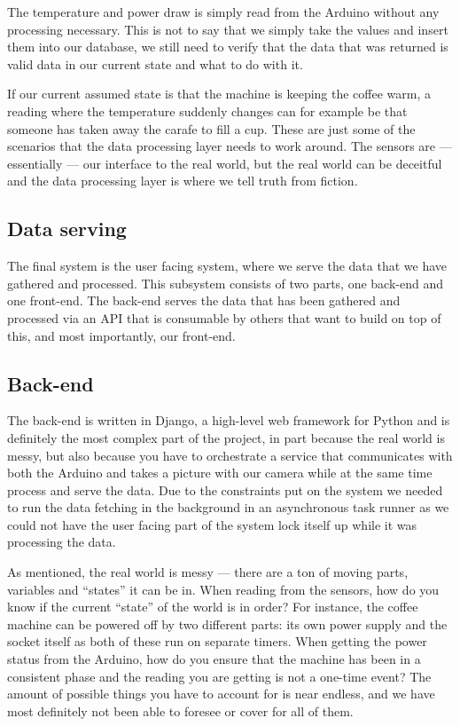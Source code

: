 \documentclass[12pt,a4paper,oneside,article]{memoir}
\numberwithin{equation}{chapter}
\begin{document}
The temperature and power draw is simply read from the Arduino without any
processing necessary. This is not to say that we simply take the values and
insert them into our database, we still need to verify that the data that was
returned is valid data in our current state and what to do with it.

If our current assumed state is that the machine is keeping the coffee warm, a
reading where the temperature suddenly changes can for example be that someone
has taken away the carafe to fill a cup. These are just some of the scenarios
that the data processing layer needs to work around. The sensors are ---
essentially --- our interface to the real world, but the real world can be
deceitful and the data processing layer is where we tell truth from fiction.

\subsection{Data serving}\label{sec:data-serving}
The final system is the user facing system, where we serve the data that we have
gathered and processed. This subsystem consists of two parts, one back-end and
one front-end. The back-end serves the data that has been gathered and processed
via an API that is consumable by others that want to build on top of this, and
most importantly, our front-end.

\subsection{Back-end}\label{sec:back-end}
The back-end is written in Django, a high-level web framework for Python and is
definitely the most complex part of the project, in part because the real world
is messy, but also because you have to orchestrate a service that communicates
with both the Arduino and takes a picture with our camera while at the same
time process and serve the data. Due to the constraints put on the system we
needed to run the data fetching in the background in an asynchronous task
runner as we could not have the user facing part of the system lock itself up
while it was processing the data.

As mentioned, the real world is messy --- there are a ton of moving parts,
variables and ``states'' it can be in. When reading from the sensors, how do you
know if the current ``state'' of the world is in order? For instance, the coffee
machine can be powered off by two different parts: its own power supply and the
socket itself as both of these run on separate timers. When getting the power
status from the Arduino, how do you ensure that the machine has been in a
consistent phase and the reading you are getting is not a one-time event? The
amount of possible things you have to account for is near endless, and we have
most definitely not been able to foresee or cover for all of them.
\end{document}
